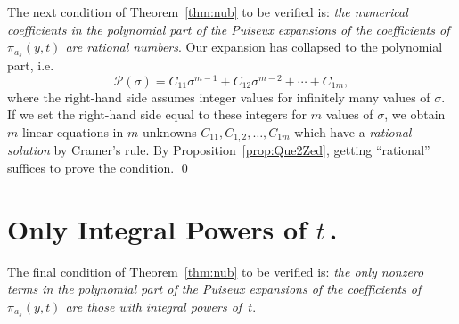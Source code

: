 \documentclass{article}
\theoremstyle{plain}
\theoremstyle{definition}
\begin{document}
The next condition of Theorem~\ref{thm:nub} to be verified is:
\emph{the numerical coefficients in the polynomial part of the Puiseux
expansions of the coefficients of $\pi_{a_s}(y,t)$ are rational
numbers}. Our expansion has collapsed to the polynomial part, i.e. 
\begin{equation}
\label{poly}
\mathcal{P}(\sigma) 
= C_{11}\sigma^{m-1} + C_{12}\sigma^{m-2} +\cdots+ C_{1m},
\end{equation}
where the right-hand side assumes integer values for infinitely many
values of $\sigma$. If we set the right-hand side equal to these
integers for $m$ values of $\sigma$, we obtain $m$ linear equations
in $m$ unknowns $C_{11},C_{1,2},\dots,C_{1m}$ which have a
\emph{rational solution} by Cramer's rule. 
By Proposition~\ref{prop:Que2Zed}, getting ``rational'' suffices to prove the condition.
\qed



\section{Only Integral Powers of \lowercase{$t$}\,.}
\label{sec:int}

The final condition of Theorem~\ref{thm:nub} to be verified is:
\emph{the only nonzero terms in the polynomial part of the Puiseux
expansions of the coefficients of $\pi_{a_s}(y,t)$ are those with
integral powers of~$t$}.


\end{document}

